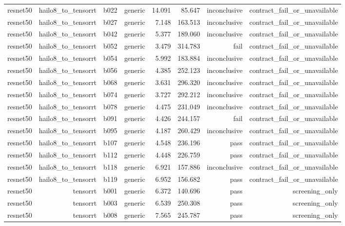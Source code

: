 \begin{table}[t]
\begin{tabular}{lrrrrrrr}
resnet50 & hailo8\_to\_tensorrt & b022 & generic & 14.091 & 85.647 & inconclusive & contract\_fail\_or\_unavailable \\
resnet50 & hailo8\_to\_tensorrt & b027 & generic & 7.148 & 163.513 & inconclusive & contract\_fail\_or\_unavailable \\
resnet50 & hailo8\_to\_tensorrt & b042 & generic & 5.377 & 189.060 & inconclusive & contract\_fail\_or\_unavailable \\
resnet50 & hailo8\_to\_tensorrt & b052 & generic & 3.479 & 314.783 & fail & contract\_fail\_or\_unavailable \\
resnet50 & hailo8\_to\_tensorrt & b054 & generic & 5.992 & 183.884 & inconclusive & contract\_fail\_or\_unavailable \\
resnet50 & hailo8\_to\_tensorrt & b056 & generic & 4.385 & 252.123 & inconclusive & contract\_fail\_or\_unavailable \\
resnet50 & hailo8\_to\_tensorrt & b068 & generic & 3.631 & 296.320 & inconclusive & contract\_fail\_or\_unavailable \\
resnet50 & hailo8\_to\_tensorrt & b074 & generic & 3.727 & 292.212 & inconclusive & contract\_fail\_or\_unavailable \\
resnet50 & hailo8\_to\_tensorrt & b078 & generic & 4.475 & 231.049 & inconclusive & contract\_fail\_or\_unavailable \\
resnet50 & hailo8\_to\_tensorrt & b091 & generic & 4.426 & 244.157 & fail & contract\_fail\_or\_unavailable \\
resnet50 & hailo8\_to\_tensorrt & b095 & generic & 4.187 & 260.429 & inconclusive & contract\_fail\_or\_unavailable \\
resnet50 & hailo8\_to\_tensorrt & b107 & generic & 4.548 & 236.196 & pass & contract\_fail\_or\_unavailable \\
resnet50 & hailo8\_to\_tensorrt & b112 & generic & 4.448 & 226.759 & pass & contract\_fail\_or\_unavailable \\
resnet50 & hailo8\_to\_tensorrt & b118 & generic & 6.921 & 157.886 & inconclusive & contract\_fail\_or\_unavailable \\
resnet50 & hailo8\_to\_tensorrt & b119 & generic & 6.952 & 156.682 & pass & contract\_fail\_or\_unavailable \\
resnet50 & tensorrt & b001 & generic & 6.372 & 140.696 & pass & screening\_only \\
resnet50 & tensorrt & b003 & generic & 6.539 & 250.308 & pass & screening\_only \\
resnet50 & tensorrt & b008 & generic & 7.565 & 245.787 & pass & screening\_only \\

\end{tabular}
\end{table}
